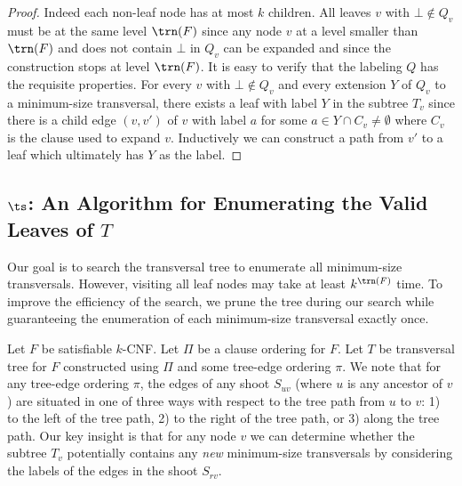 \begin{proof}
Indeed each non-leaf node has at most $k$ children.
All leaves $v$ with $\bot\notin Q_v$ must be at the same level $\trn(F)$
since any node $v$ at a level smaller than $\trn(F)$ 
and does not contain $\bot$ in $Q_v$ can be expanded
and since the construction stops at level $\trn(F)$.
It is easy to verify that the labeling $Q$ has the requisite properties.
For every $v$ with $\bot \notin Q_v$
and every extension $Y$ of $Q_v$ to a minimum-size transversal, there exists a
leaf with label $Y$ in the subtree $T_v$ since there is a child edge $(v,v')$ of $v$ with label $a$ for some $a \in Y \cap C_v \ne \emptyset$ where $C_v$ is the clause used to expand $v$. Inductively we can construct a path from $v'$ to a leaf which ultimately has $Y$ as the label.
\end{proof}


\subsection{$\ts$: An Algorithm for Enumerating the Valid Leaves of $T$}

Our goal is to search the transversal tree to enumerate 
all minimum-size transversals. 
However, visiting 
all leaf nodes
may take at least $k^{\trn(F)}$ time. 
To improve the efficiency of the search,
we prune the tree during our search while
guaranteeing the enumeration of  
each minimum-size transversal exactly once.


Let $F$ be satisfiable $k$-CNF.
Let $\Pi$ be a clause ordering for $F$. Let $T$ be transversal
tree for $F$ constructed using $\Pi$ and some tree-edge ordering $\pi$. 
We note that for any tree-edge ordering $\pi$,
the edges of any 
shoot $S_{uv}$ (where $u$ is any ancestor of $v$)
are situated in one of three ways with respect to
the tree path from $u$ to $v$:
1) to the left of the tree path, 
2) to the right of the tree path, or
3) along the tree path.
Our key insight is that for any node $v$
we can determine 
whether the  subtree $T_v$ potentially contains 
any \emph{new }
minimum-size transversals by considering the labels of the edges
in the shoot $S_{rv}$.


